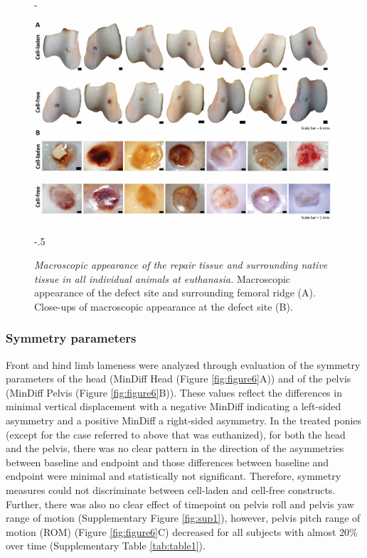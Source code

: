 \documentclass[twocolumn, empirical, authordate, issue]{jote-new-article}
\begin{document}
\begin{figure}[b!]
\captionsetup{width=\dimexpr\linewidth+\fullwidthlen\relax}
\begin{adjustwidth}{-\fullwidthlen}{}

\centering \includegraphics[width=\columnwidth+\fullwidthlen]{media/image7.jpg}
\end{adjustwidth}

\begin{adjustwidth}{-.5\fullwidthlen}{}
\caption{\emph{Macroscopic appearance of the repair tissue and surrounding native tissue in all individual animals at euthanasia.} Macroscopic appearance of the defect site and surrounding femoral ridge (A). Close-ups of macroscopic appearance at the defect site (B).}
\label{fig:figure7}
\end{adjustwidth}

\end{figure}
\subsubsection{Symmetry parameters} 

Front and hind limb lameness were analyzed through evaluation of the symmetry parameters of the head (MinDiff Head (Figure \ref{fig:figure6}A)) and of the pelvis (MinDiff Pelvis (Figure \ref{fig:figure6}B)). These values reflect the differences in minimal vertical displacement with a negative MinDiff indicating a left-sided asymmetry and a positive MinDiff a right-sided asymmetry. In the treated ponies (except for the case referred to above that was euthanized), for both the head and the pelvis, there was no clear pattern in the direction of the asymmetries between baseline and endpoint and those differences between baseline and endpoint were minimal and statistically not significant. Therefore, symmetry measures could not discriminate between cell-laden and cell-free constructs. Further, there was also no clear effect of timepoint on pelvis roll and pelvis yaw range of motion (Supplementary Figure \ref{fig:sup1}), however, pelvis pitch range of motion (ROM) (Figure \ref{fig:figure6}C) decreased for all subjects with almost 20\% over time (Supplementary Table \ref{tab:table1}).
\end{document}
